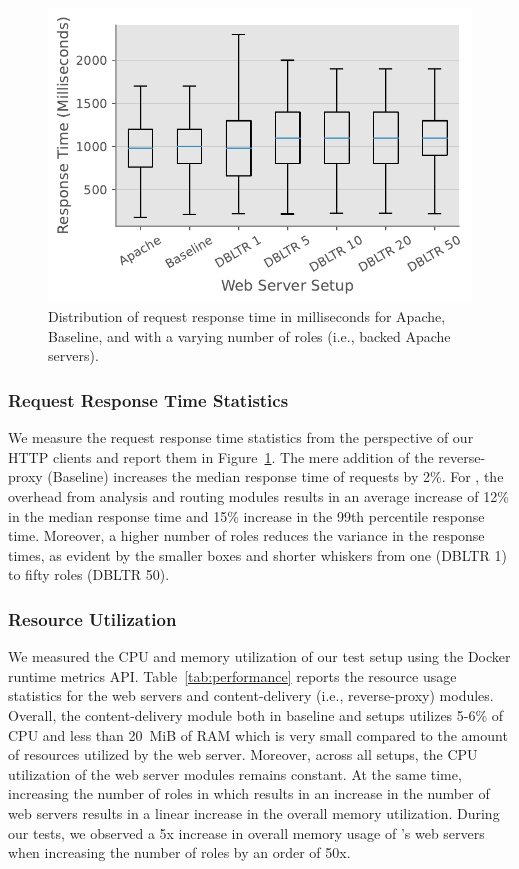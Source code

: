 \begin{figure}[]
    \centering
    \includegraphics[width=0.55
    \textwidth]{figures/dbltr/performance.pdf}
    \caption{Distribution of request response time in milliseconds for Apache, Baseline, and \sys{} with a varying number of roles (i.e., backed Apache servers).}
    \label{fig:performance}
  \end{figure}

\subsubsection{Request Response Time Statistics}
We measure the request response time statistics from the perspective of our HTTP clients and report them in Figure~\ref{fig:performance}. 
The mere addition of the reverse-proxy (Baseline) increases the median response time of requests by 2\%. 
For \sys{}, the overhead from analysis and routing modules results in an average increase of 12\% in the median response time and 15\% increase in the 99th percentile response time. 
Moreover, a higher number of roles reduces the variance in the response times, as evident by the smaller boxes and shorter whiskers from one (DBLTR 1) to fifty roles (DBLTR 50). 

\subsubsection{Resource Utilization}
We measured the CPU and memory utilization of our test setup using the Docker runtime metrics API. 
Table~\ref{tab:performance} reports the resource usage statistics for the web servers and content-delivery (i.e., reverse-proxy) modules. 
Overall, the content-delivery module both in baseline and \sys{} setups utilizes 5-6\% of CPU and less than 20~MiB of RAM which is very small compared to the amount of resources utilized by the web server. 
Moreover, across all setups, the CPU utilization of the web server modules remains constant. 
At the same time, increasing the number of roles in \sys{} which results in an increase in the number of web servers results in a linear increase in the overall memory utilization. 
During our tests, we observed a 5x increase in overall memory usage of \sys's web servers when increasing the number of roles by an order of 50x. 

